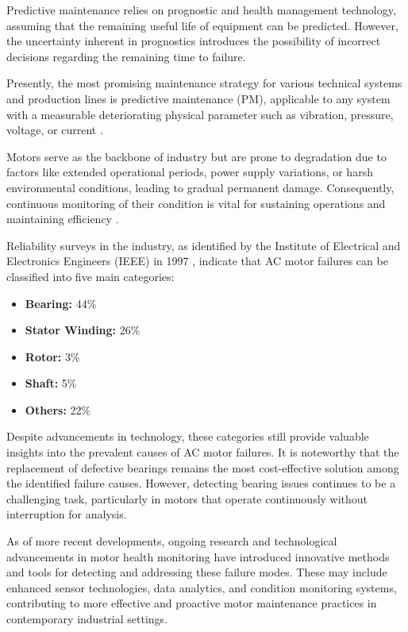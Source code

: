 Predictive maintenance relies on prognostic and health management technology, assuming that the remaining useful life of equipment can be predicted. However, the uncertainty inherent in prognostics introduces the possibility of incorrect decisions regarding the remaining time to failure.

Presently, the most promising maintenance strategy for various technical systems and production lines is predictive maintenance (PM), applicable to any system with a measurable deteriorating physical parameter such as vibration, pressure, voltage, or current \cite{sampaio_prediction_2019}.

Motors serve as the backbone of industry but are prone to degradation due to factors like extended operational periods, power supply variations, or harsh environmental conditions, leading to gradual permanent damage. Consequently, continuous monitoring of their condition is vital for sustaining operations and maintaining efficiency \cite{han_motor_2019}.

Reliability surveys in the industry, as identified by the Institute of Electrical and Electronics Engineers (IEEE) in 1997 \cite{Cheng:2018aa}, indicate that AC motor failures can be classified into five main categories:

\begin{itemize}
	\item \textbf{Bearing:} 44\%
	\item \textbf{Stator Winding:} 26\%
	\item \textbf{Rotor:} 3\%
	\item \textbf{Shaft:} 5\%
	\item \textbf{Others:} 22\%
\end{itemize}

Despite advancements in technology, these categories still provide valuable insights into the prevalent causes of AC motor failures. It is noteworthy that the replacement of defective bearings remains the most cost-effective solution among the identified failure causes. However, detecting bearing issues continues to be a challenging task, particularly in motors that operate continuously without interruption for analysis.

As of more recent developments, ongoing research and technological advancements in motor health monitoring have introduced innovative methods and tools for detecting and addressing these failure modes. These may include enhanced sensor technologies, data analytics, and condition monitoring systems, contributing to more effective and proactive motor maintenance practices in contemporary industrial settings.
